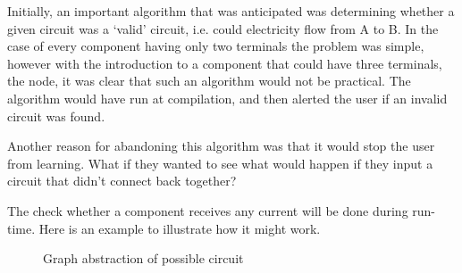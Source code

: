 
        Initially, an important algorithm that was anticipated was determining whether a given circuit was a `valid' circuit, i.e. could electricity flow from A to B. 
        In the case of every component having only two terminals the problem was simple, however with the introduction to a component that could have three terminals, the node, it was clear that such an algorithm would not be practical. 
        The algorithm would have run at compilation, and then alerted the user if an invalid circuit was found. 

        Another reason for abandoning this algorithm was that it would stop the user from learning. 
        What if they wanted to see what would happen if they input a circuit that didn't connect back together? 

        The check whether a component receives any current will be done during run-time. 
        Here is an example to illustrate how it might work. 

        \begin{figure}[!ht]
            \centering
            \caption{Graph abstraction of possible circuit}
            \label{fig:example-circuit-traversal}
        \end{figure}

